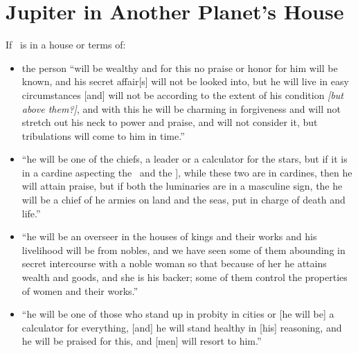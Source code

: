 \section{Jupiter in Another Planet's House}
If \Jupiter\, is in a house or terms of:
\begin{itemize}[topsep=0em,itemsep=0em]
\item[\Saturn] the person ``will be wealthy and for this no praise or honor for him will be known, and his secret affair[s] will not be looked into, but he will live in easy circumstances [and] will not be according to the extent of his condition  \textsl{[but above them?]}, and with this he will be charming in forgiveness and will not stretch out his neck to power and praise, and will not consider it, but tribulations will come to him in time.''

\item[\Mars] ``he will be one of the chiefs, a leader or a calculator for the stars, but if it is in a cardine aspecting the \Moon\, and the \Sun], while these two are in cardines, then he will attain praise, but if both the luminaries are in a masculine sign, the he will be a chief of he armies on land and the seas, put in charge of death and life.''

\item[\Venus] ``he will be an overseer in the houses of kings and their works and his livelihood will be from nobles, and we have seen some of them abounding in secret intercourse with a noble woman so that because of her he attains wealth and goods, and she is his backer; some of them control the properties of women and their works.''

\item[\Mercury] ``he will be one of those who stand up in probity in cities or [he will be] a calculator for everything, [and] he will stand healthy in [his] reasoning, and he will be praised for this, and [men] will resort to him.''
\end{itemize}
